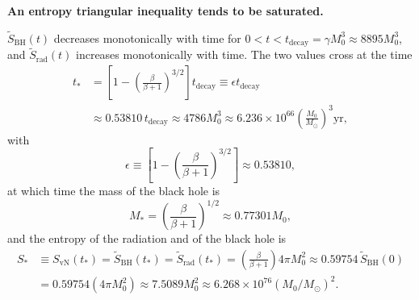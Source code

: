 \documentclass[12pt]{article}
\begin{document}
{\bf An entropy triangular inequality tends to be saturated.}

$\tilde{S}_\mathrm{BH}(t)$ decreases monotonically with time for $0 < t < t_\mathrm{decay} = \gamma M_0^3 \approx 8895 M_0^3$, and $\tilde{S}_\mathrm{rad}(t)$ increases monotonically with time.  The two values cross at the time
\begin{equation}
\begin{split}
t_\ast & = \left[1-\left(\frac{\beta}{\beta+1}\right)^{3/2}\right]t_\mathrm{decay} \equiv \epsilon t_\mathrm{decay} \\
& \approx 0.53810\, t_\mathrm{decay} \approx 4786 M_0^3 
\approx 6.236\!\times\!10^{66}\!\left(\frac{M_0}{M_\odot}\right)^3\!\mathrm{yr},
\label{Page-time}
\end{split}
\end{equation}
with 
\begin{equation}
\epsilon \equiv
 \left[1-\left(\frac{\beta}{\beta+1}\right)^{3/2}\right] \approx 0.53810,
\label{Page-time-fraction}
\end{equation}
at which time the mass of the black hole is
\begin{equation}
M_\ast = \left(\frac{\beta}{\beta+1}\right)^{1/2}\approx 0.77301 M_0, 
\label{Page-mass}
\end{equation}
and the entropy of the radiation and of the black hole is
\begin{equation}
\begin{split}
S_\ast \! &\equiv \! S_\mathrm{vN}(t_\ast) \! = \! 
\tilde{S}_\mathrm{BH}(t_\ast) \! = \! \tilde{S}_\mathrm{rad}(t_\ast)
\! = \! \left(\frac{\beta}{\beta+1}\right)4\pi M_0^2
\! \approx \! 0.59754 \,\tilde{S}_\mathrm{BH}(0)
\\
&= 0.59754(4\pi M_0^2) \approx 7.5089 M_0^2
 \approx 6.268\times 10^{76} (M_0/M_\odot)^2. 
\label{Page-entropy}
\end{split}
\end{equation}
\end{document}
